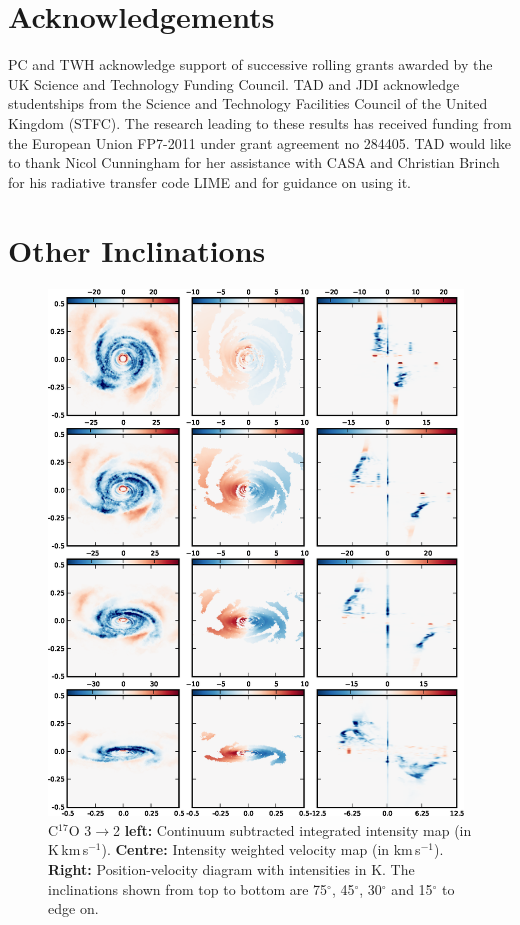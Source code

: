 \documentclass[useAMS,usenatbib]{mn2e}
\begin{document}
\smallskip

\section*{Acknowledgements}
PC and TWH acknowledge support of successive rolling grants awarded by the UK Science and Technology Funding Council. 
TAD and JDI acknowledge studentships from the Science and Technology Facilities Council of the United Kingdom (STFC).
The research leading to these results has received funding from the European Union FP7-2011 under grant agreement no 284405.
TAD would like to thank Nicol Cunningham for her assistance with CASA and Christian Brinch for his radiative transfer code LIME and for guidance on using it.


 


\appendix

\section{Other Inclinations} \label{sec:other_inc}


\begin{figure}
 \includegraphics[width=110mm]{Figures/sim/appendix_inclinations2.eps}

 \caption{C$^{17}$O 3$\rightarrow$2 {\bf left:} Continuum subtracted integrated intensity map (in K$\,$km$\,$s$^{-1}$). {\bf Centre:} Intensity weighted velocity map (in km$\,$s$^{-1}$). {\bf Right:} Position-velocity diagram with intensities in K. The inclinations shown from top to bottom are 75$^\circ$, 45$^\circ$, 30$^\circ$ and 15$^\circ$ to edge on.}
\end{figure}
\end{document}

